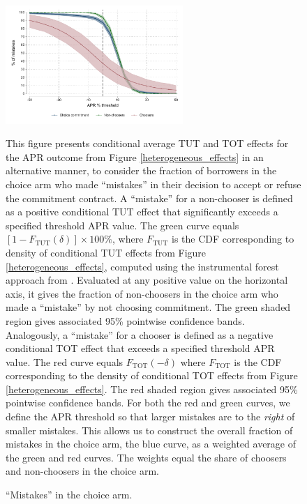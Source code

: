 \documentclass[11pt, a4paper]{article}
\begin{document}
\begin{figure}[H]
\begin{center}
        \centering
        \includegraphics[width=0.6\textwidth]{Figuras/line_cw_apr_tot_tut.pdf}

 \end{center}       
 \caption{``Mistakes'' in the choice arm.}
 
 \scriptsize{This figure presents conditional average TUT and TOT effects for the APR outcome from Figure \ref{heterogeneous_effects} in an alternative manner, to consider the fraction of borrowers in the choice arm who made ``mistakes'' in their decision to accept or refuse the commitment contract. A ``mistake'' for a non-chooser is defined as a positive conditional TUT effect that significantly exceeds a specified threshold APR value.
 The green curve equals $[1 - F_{\text{TUT}}(\delta)]\times 100\%$, where $F_{\text{TUT}}$ is the CDF corresponding to density of conditional TUT effects from Figure \ref{heterogeneous_effects}, computed using the instrumental forest approach from \cite{atheygrf}. Evaluated at any positive value on the horizontal axis, it gives the fraction of non-choosers in the choice arm who made a ``mistake'' by not choosing commitment. The green shaded region gives associated 95\% pointwise confidence bands. 
Analogously, a ``mistake'' for a chooser is defined as a negative conditional TOT effect that exceeds a specified threshold APR value. The red curve equals $F_{\text{TOT}}(-\delta)$ where $F_{\text{TOT}}$ is the CDF corresponding to the density of conditional TOT effects from Figure \ref{heterogeneous_effects}. 
The red shaded region gives associated 95\% pointwise confidence bands.
For both the red and green curves, we define the APR threshold so that larger mistakes are to the \emph{right} of smaller mistakes.
This allows us to construct the overall fraction of mistakes in the choice arm, the blue curve, as a weighted average of the green and red curves.
The weights equal the share of choosers and non-choosers in the choice arm.}
    \label{choose_wrong}
\end{figure}
\end{document}
